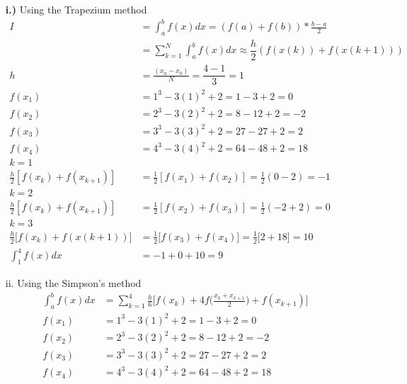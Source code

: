 \documentclass[a4paper,12pt]{article}
\begin{document}
\begin{itemize}
\item[\textbf{i.)}] Using the Trapezium method
\begin{align*}
I &=  \int_{a}^{b} f\left( x\right) dx = \left(f \left(a \right)+f\left( b\right) \right) * \frac{b-a}{2}\\
  &= \sum_{k=1}^{N}  \int_{a}^{b} f\left( x\right) dx \approx \dfrac{h}{2} \left(f(x(k)) + f(x(k+1))\right)\\
  h &= \frac{\left( x_{n} - x_{0}\right)}{N} = \dfrac{4-1}{3} = 1\\
f\left( x_{1}\right) &= 1^{3} - 3\left( 1\right)^{2} + 2 = 1 - 3 + 2 = 0\\
f\left( x_{2}\right) &= 2^{3} - 3\left( 2\right)^{2} + 2 = 8 - 12 + 2 = -2\\
f\left( x_{3}\right) &= 3^{3} - 3\left( 3\right)^{2} + 2 = 27 - 27 + 2 = 2\\
f\left( x_{4}\right) &= 4^{3} - 3\left( 4\right)^{2} + 2 = 64 - 48 + 2 = 18\\
k = 1\\
\frac{h}{2}\left[ f\left( x_{k}\right)    + f\left( x_{k+1}\right) \right] &= \frac{1}{2}\left[ f\left( x_{1}\right) + f\left( x_{2}\right) \right] = \frac{1}{2}\left( 0 - 2 \right) = -1 \\
k = 2\\
\frac{h}{2}\left[ f\left( x_{k}\right)    + f\left( x_{k+1}\right) \right] &= \frac{1}{2}\left[ f\left( x_{2}\right) + f\left( x_{3}\right) \right] = \frac{1}{2}\left( -2 + 2 \right) = 0 \\
k=3\\
\frac{h}{2} \big[ f(x_k)+ f(x(k+1))\big]&=\frac{1}{2}\big[ f(x_3)+f(x_4)\big]=\frac{1}{2}\big[ 2+18\big]=10\\
\int^4_1 f(x)dx &= -1+0+10=9
\end{align*}
\item[ii.] Using the Simpson's method
\begin{align*}
\int_a^b f(x)dx&=\sum \limits_{k=1}^{4} \frac{h}{6} \big [f(x_{k}) + 4f \big(\frac{x_{k}+x_{k+1}}{2}\big)+f(x_{k+1})\big]\\
f\left( x_{1}\right) &= 1^{3} - 3\left( 1\right)^{2} + 2 = 1 - 3 + 2 = 0\\
f\left( x_{2}\right) &= 2^{3} - 3\left( 2\right)^{2} + 2 = 8 - 12 + 2 = -2\\
f\left( x_{3}\right) &= 3^{3} - 3\left( 3\right)^{2} + 2 = 27 - 27 + 2 = 2\\
f\left( x_{4}\right) &= 4^{3} - 3\left( 4\right)^{2} + 2 = 64 - 48 + 2 = 18\\

\end{align*}
\end{itemize}
\end{document}
